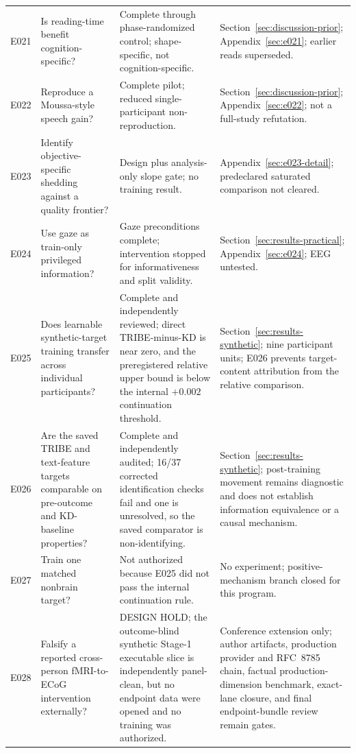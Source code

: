 \begin{longtable}{p{}p{}p{}p{}}
E021 & Is reading-time benefit cognition-specific? & Complete through phase-randomized control; shape-specific, not cognition-specific. & Section~\ref{sec:discussion-prior}; Appendix~\ref{sec:e021}; earlier reads superseded. \\
E022 & Reproduce a Moussa-style speech gain? & Complete pilot; reduced single-participant non-reproduction. & Section~\ref{sec:discussion-prior}; Appendix~\ref{sec:e022}; not a full-study refutation. \\
E023 & Identify objective-specific shedding against a quality frontier? & Design plus analysis-only slope gate; no training result. & Appendix~\ref{sec:e023-detail}; predeclared saturated comparison not cleared. \\
E024 & Use gaze as train-only privileged information? & Gaze preconditions complete; intervention stopped for informativeness and split validity. & Section~\ref{sec:results-practical}; Appendix~\ref{sec:e024}; EEG untested. \\
E025 & Does learnable synthetic-target training transfer across individual participants? & Complete and independently reviewed; direct TRIBE-minus-KD is near zero, and the preregistered relative upper bound is below the internal $+0.002$ continuation threshold. & Section~\ref{sec:results-synthetic}; nine participant units; E026 prevents target-content attribution from the relative comparison. \\
E026 & Are the saved TRIBE and text-feature targets comparable on pre-outcome and KD-baseline properties? & Complete and independently audited; 16/37 corrected identification checks fail and one is unresolved, so the saved comparator is non-identifying. & Section~\ref{sec:results-synthetic}; post-training movement remains diagnostic and does not establish information equivalence or a causal mechanism. \\
E027 & Train one matched nonbrain target? & Not authorized because E025 did not pass the internal continuation rule. & No experiment; positive-mechanism branch closed for this program. \\
E028 & Falsify a reported cross-person fMRI-to-ECoG intervention externally? & DESIGN HOLD; the outcome-blind synthetic Stage-1 executable slice is independently panel-clean, but no endpoint data were opened and no training was authorized. & Conference extension only; author artifacts, production provider and RFC~8785 chain, factual production-dimension benchmark, exact-lane closure, and final endpoint-bundle review remain gates. \\

\end{longtable}
